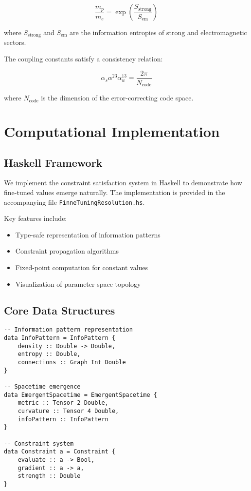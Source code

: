 \documentclass[12pt,a4paper]{article}
\begin{document}
\begin{equation}
\frac{m_p}{m_e} = \exp\left(\frac{S_{\text{strong}}}{S_{\text{em}}}\right)
\end{equation}

where $S_{\text{strong}}$ and $S_{\text{em}}$ are the information entropies of strong and electromagnetic sectors.

The coupling constants satisfy a consistency relation:

\begin{equation}
\alpha_s \alpha^{23} \alpha_w^{13} = \frac{2\pi}{N_{\text{code}}}
\end{equation}

where $N_{\text{code}}$ is the dimension of the error-correcting code space.

\section{Computational Implementation}

\subsection{Haskell Framework}

We implement the constraint satisfaction system in Haskell to demonstrate how fine-tuned values emerge naturally. The implementation is provided in the accompanying file \texttt{FinneTuningResolution.hs}.

Key features include:
\begin{itemize}
\item Type-safe representation of information patterns
\item Constraint propagation algorithms
\item Fixed-point computation for constant values
\item Visualization of parameter space topology
\end{itemize}

\subsection{Core Data Structures}

\begin{lstlisting}
-- Information pattern representation
data InfoPattern = InfoPattern {
    density :: Double -> Double,
    entropy :: Double,
    connections :: Graph Int Double
}

-- Spacetime emergence
data EmergentSpacetime = EmergentSpacetime {
    metric :: Tensor 2 Double,
    curvature :: Tensor 4 Double,
    infoPattern :: InfoPattern
}

-- Constraint system
data Constraint a = Constraint {
    evaluate :: a -> Bool,
    gradient :: a -> a,
    strength :: Double
}
\end{lstlisting}
\end{document}
